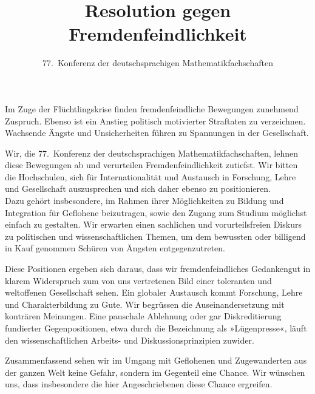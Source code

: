 \documentclass[12pt,a4paper,ngerman,DIV=calc]{scrartcl}
\author{77.~Konferenz der deutschsprachigen
  Mathematikfachschaften}
\title{Resolution gegen Fremdenfeindlichkeit}
\begin{document}
\maketitle{}

Im Zuge der Flüchtlingskrise finden fremdenfeindliche Bewegungen
zunehmend Zuspruch. Ebenso ist ein Anstieg  politisch
motivierter Straftaten zu verzeichnen. Wachsende Ängste und
Unsicherheiten führen zu Spannungen in der Gesellschaft.

Wir, die 77.~Konferenz der deutschsprachigen Mathematikfachschaften,
lehnen diese Bewegungen ab und verurteilen Fremdenfeindlichkeit
zutiefst. Wir bitten die Hochschulen, sich für Internationalität und
Austausch in Forschung, Lehre und Gesellschaft
auszusprechen und sich daher ebenso zu positionieren. \\
Dazu gehört insbesondere, im Rahmen ihrer Möglichkeiten zu Bildung und
Integration für Geflohene beizutragen, sowie den Zugang zum Studium
möglichst  einfach zu gestalten. Wir erwarten einen
sachlichen und vorurteilsfreien Diskurs zu politischen und
wissenschaftlichen Themen, um dem bewussten  oder billigend in Kauf genommen Schüren von Ängsten
entgegenzutreten.

Diese Positionen ergeben sich daraus, dass wir fremdenfeindliches
Gedankengut in klarem Widerspruch zum von uns vertretenen Bild einer
toleranten und weltoffenen Gesellschaft sehen. Ein globaler Austausch
kommt Forschung, Lehre und Charakterbildung zu Gute. Wir begrüssen die
Auseinandersetzung mit konträren Meinungen. Eine pauschale Ablehnung
oder gar Diskreditierung fundierter Gegenpositionen, etwa durch die
Bezeichnung als »Lügenpresse«, läuft den wissenschaftlichen Arbeits-
und Diskussionsprinzipien zuwider.

Zusammenfassend sehen wir im Umgang mit Geflohenen und Zugewanderten
aus der ganzen Welt keine Gefahr, sondern im Gegenteil eine
Chance. Wir wünschen uns, dass insbesondere die hier Angeschriebenen
diese Chance ergreifen.
\end{document}
